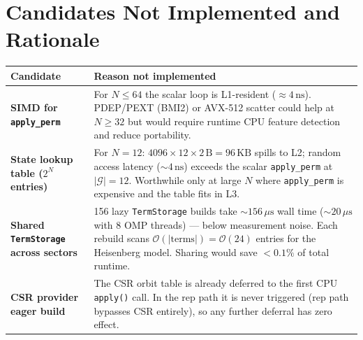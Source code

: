 \documentclass[11pt,a4paper]{article}
\begin{document}
\section{Candidates Not Implemented and Rationale}
\label{sec:notdone}

\begin{center}
\begin{tabular}{@{}p{4cm}p{9.5cm}@{}}
\toprule
Candidate & Reason not implemented \\
\midrule
\textbf{SIMD for \texttt{apply\_perm}} &
  For $N \le 64$ the scalar loop is L1-resident ($\approx 4\,\mathrm{ns}$).
  PDEP/PEXT (BMI2) or AVX-512 scatter could help at $N \ge 32$ but would
  require runtime CPU feature detection and reduce portability. \\

\textbf{State lookup table ($2^N$ entries)} &
  For $N=12$: $4096 \times 12 \times 2\,\mathrm{B} = 96\,\mathrm{KB}$
  spills to L2; random access latency ($\sim 4\,\mathrm{ns}$) exceeds the
  scalar \texttt{apply\_perm} at $|\mathcal{G}| = 12$.  Worthwhile only at
  large $N$ where \texttt{apply\_perm} is expensive and the table fits in
  L3. \\

\textbf{Shared \texttt{TermStorage} across sectors} &
  156 lazy \texttt{TermStorage} builds take $\sim 156\,\mu\mathrm{s}$ wall
  time ($\sim 20\,\mu\mathrm{s}$ with 8 OMP threads) — below measurement
  noise.  Each rebuild scans $\mathcal{O}(|\mathrm{terms}|) = \mathcal{O}(24)$
  entries for the Heisenberg model.  Sharing would save $<0.1\%$ of total
  runtime. \\

\textbf{CSR provider eager build} &
  The CSR orbit table is already deferred to the first CPU \texttt{apply()}
  call.  In the rep path it is never triggered (rep path bypasses CSR
  entirely), so any further deferral has zero effect. \\
\bottomrule
\end{tabular}
\end{center}
\end{document}
